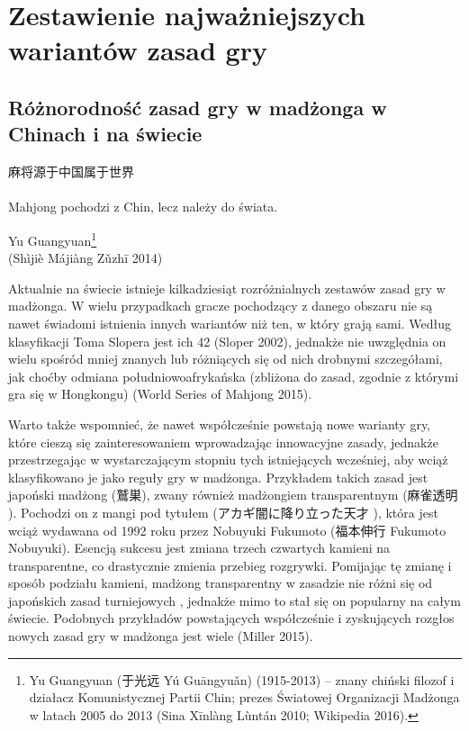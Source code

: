 \chapter{Zestawienie najważniejszych wariantów zasad gry}
\label{zestawienie_zasad}
\section{Różnorodność zasad gry w madżonga w Chinach i na świecie}
\epigraph{麻将源于中国属于世界 \\ 
\footnotesize {} \normalsize \\
Mahjong pochodzi z Chin, lecz
należy do świata.}{Yu Guangyuan\footnote{Yu Guangyuan (于光远 Yú
Guāngyuǎn) (1915-2013) -- znany chiński filozof i działacz Komunistycznej Partii
Chin; prezes Światowej Organizacji Madżonga w latach 2005 do 2013 (Sina
Xīnlàng Lùntán 2010; Wikipedia 2016).}
\\ (Shìjiè Májiàng Zǔzhī 2014)}

Aktualnie na świecie istnieje kilkadziesiąt rozróżnialnych zestawów zasad gry
w madżonga. W wielu przypadkach gracze pochodzący z danego obszaru nie są
nawet świadomi istnienia innych wariantów niż ten, w który grają sami. Według
klasyfikacji Toma Slopera jest ich 42 (Sloper 2002), jednakże nie uwzględnia on
wielu spośród mniej znanych lub różniących się od nich drobnymi szczegółami, jak
choćby odmiana południowoafrykańska (zbliżona do zasad, zgodnie z którymi gra
się w Hongkongu) (World Series of Mahjong 2015).

Warto także wspomnieć, że nawet współcześnie powstają nowe warianty gry, które
cieszą się zainteresowaniem wprowadzając innowacyjne zasady, jednakże przestrzegając w
wystarczającym stopniu tych istniejących wcześniej, aby wciąż klasyfikowano je
jako reguły gry w madżonga. \label{washizu} Przykładem takich zasad jest
japoński madżong  (鷲巣), zwany również madżongiem transparentnym
(麻雀透明 ). Pochodzi on z mangi pod tytułem  (アカギ闇に降り立った天才  
  ), która jest wciąż wydawana od
1992 roku przez \mbox{Nobuyuki} \mbox{Fukumoto} (福本伸行 \mbox{Fukumoto}
\mbox{Nobuyuki}).
Esencją sukcesu  jest zmiana trzech czwartych kamieni na transparentne, co
drastycznie zmienia przebieg rozgrywki. Pomijając tę zmianę i sposób podziału
kamieni, madżong transparentny w zasadzie nie różni się od japońskich zasad
turniejowych ,
jednakże mimo to stał się on popularny na całym świecie. Podobnych przykładów
powstających współcześnie i zyskujących rozgłos nowych zasad gry w madżonga jest
wiele (Miller 2015).

